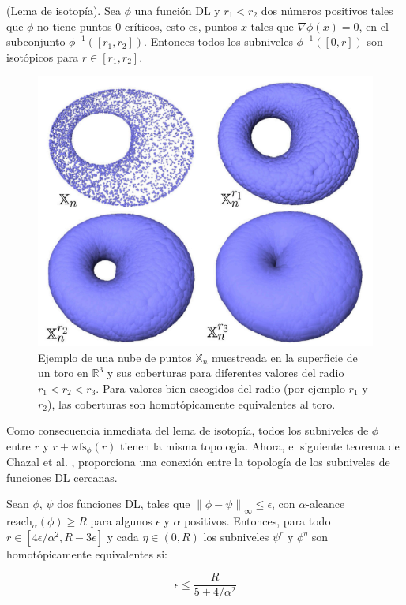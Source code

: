 \begin{lema}
    (Lema de isotop\'ia). Sea $\phi$ una funci\'on DL y $r_{1}<r_{2}$ dos n\'umeros positivos tales que
    $\phi$ no tiene puntos $0$-cr\'iticos, esto es, puntos $x$ tales que $\nabla\phi\left(x\right)=0$,
    en el subconjunto $\phi^{-1}\left(\left[r_{1},r_{2}\right]\right)$. Entonces todos los subniveles
    $\phi^{-1}\left(\left[0,r\right]\right)$ son isot\'opicos para $r\in\left[r_{1},r_{2}\right]$.
\end{lema}

\begin{figure}[ht]
    \centering
    \includegraphics[width=0.85\linewidth]{./figures/Figura5.png}
    \caption{
        Ejemplo de una nube de puntos $\mathbb{X}_{n}$ muestreada en la
        superficie de un toro en $\mathbb{R}^{3}$ y sus coberturas para
        diferentes valores del radio $r_{1}<r_{2}<r_{3}$. Para valores
        bien escogidos del radio (por ejemplo $r_{1}$ y $r_{2}$), las
        coberturas son homot\'opicamente equivalentes al toro.
    }
    \label{fig:Figura 5}
    \vspace{15pt}
\end{figure}

Como consecuencia inmediata del lema de isotop\'ia, todos los subniveles de $\phi$ entre $r$ y
$r + \mathrm{wfs}_{\phi}\left(r\right)$ tienen la misma topolog\'ia. Ahora, el siguiente teorema de
Chazal et al. \cite{Chazal2011b}, proporciona una conexi\'on entre la topolog\'ia de los subniveles
de funciones DL cercanas.

\newpage

\begin{teorema}\label{teoRecon}
    Sean $\phi$, $\psi$ dos funciones DL, tales que
    $\left\|\phi-\psi\right\|_{\infty}\leq\epsilon$, con $\alpha$-alcance
    $\mathrm{reach}_{\alpha}\left(\phi\right)\geq R$ para algunos $\epsilon$ y $\alpha$ positivos.
    Entonces, para todo $r\in\left[4\epsilon/\alpha^{2}, R-3\epsilon\right]$ y cada
    $\eta\in\left(0, R\right)$ los subniveles $\psi^{r}$ y $\phi^{\eta}$ son homot\'opicamente
    equivalentes si:
    
    \begin{equation*}
        \epsilon\leq\frac{R}{5+4/\alpha^{2}}
    \end{equation*}
\end{teorema}

